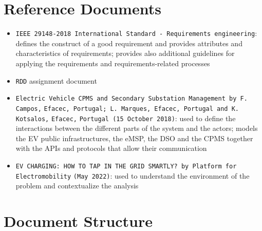 
\section{Reference Documents}
\label{sec:Reference Documents}%
\begin{itemize}
    \item \verb|IEEE 29148-2018 International Standard - Requirements engineering|: defines the construct of a good requirement and provides attributes and characteristics of requirements; provides also additional guidelines for applying the requirements and requirements-related processes
    \item \verb|RDD| assignment document
    \item \verb|Electric Vehicle CPMS and Secondary Substation Management by F. Campos,| \verb|Efacec, Portugal; L. Marques, Efacec, Portugal and K. Kotsalos,| \verb|Efacec,| \verb|Portugal (15 October 2018)|: used to define the interactions between the different parts of the system and the actors; models the EV public infrastructures, the eMSP, the DSO and the CPMS together with the APIs and protocols that allow their communication
    \item \verb|EV CHARGING: HOW TO TAP IN THE GRID SMARTLY? by Platform |\verb|for|\\\verb|Electromobility| \verb|(May 2022)|: used to understand the environment of the problem and contextualize the analysis
\end{itemize}

\section{Document Structure}
\label{sec:Document Structure}%
